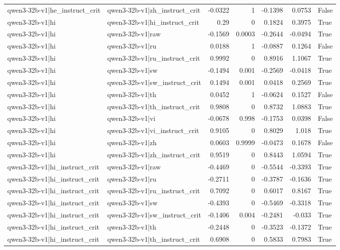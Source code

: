 \begin{table}
\begin{tabular}{l l r r r r l}
qwen3-32b-v1|he_instruct_crit & qwen3-32b-v1|zh_instruct_crit & -0.0322 & 1 & -0.1398 & 0.0753 & False \\
qwen3-32b-v1|hi & qwen3-32b-v1|hi_instruct_crit & 0.29 & 0 & 0.1824 & 0.3975 & True \\
qwen3-32b-v1|hi & qwen3-32b-v1|raw & -0.1569 & 0.0003 & -0.2644 & -0.0494 & True \\
qwen3-32b-v1|hi & qwen3-32b-v1|ru & 0.0188 & 1 & -0.0887 & 0.1264 & False \\
qwen3-32b-v1|hi & qwen3-32b-v1|ru_instruct_crit & 0.9992 & 0 & 0.8916 & 1.1067 & True \\
qwen3-32b-v1|hi & qwen3-32b-v1|sw & -0.1494 & 0.001 & -0.2569 & -0.0418 & True \\
qwen3-32b-v1|hi & qwen3-32b-v1|sw_instruct_crit & 0.1494 & 0.001 & 0.0418 & 0.2569 & True \\
qwen3-32b-v1|hi & qwen3-32b-v1|th & 0.0452 & 1 & -0.0624 & 0.1527 & False \\
qwen3-32b-v1|hi & qwen3-32b-v1|th_instruct_crit & 0.9808 & 0 & 0.8732 & 1.0883 & True \\
qwen3-32b-v1|hi & qwen3-32b-v1|vi & -0.0678 & 0.998 & -0.1753 & 0.0398 & False \\
qwen3-32b-v1|hi & qwen3-32b-v1|vi_instruct_crit & 0.9105 & 0 & 0.8029 & 1.018 & True \\
qwen3-32b-v1|hi & qwen3-32b-v1|zh & 0.0603 & 0.9999 & -0.0473 & 0.1678 & False \\
qwen3-32b-v1|hi & qwen3-32b-v1|zh_instruct_crit & 0.9519 & 0 & 0.8443 & 1.0594 & True \\
qwen3-32b-v1|hi_instruct_crit & qwen3-32b-v1|raw & -0.4469 & 0 & -0.5544 & -0.3393 & True \\
qwen3-32b-v1|hi_instruct_crit & qwen3-32b-v1|ru & -0.2711 & 0 & -0.3787 & -0.1636 & True \\
qwen3-32b-v1|hi_instruct_crit & qwen3-32b-v1|ru_instruct_crit & 0.7092 & 0 & 0.6017 & 0.8167 & True \\
qwen3-32b-v1|hi_instruct_crit & qwen3-32b-v1|sw & -0.4393 & 0 & -0.5469 & -0.3318 & True \\
qwen3-32b-v1|hi_instruct_crit & qwen3-32b-v1|sw_instruct_crit & -0.1406 & 0.004 & -0.2481 & -0.033 & True \\
qwen3-32b-v1|hi_instruct_crit & qwen3-32b-v1|th & -0.2448 & 0 & -0.3523 & -0.1372 & True \\
qwen3-32b-v1|hi_instruct_crit & qwen3-32b-v1|th_instruct_crit & 0.6908 & 0 & 0.5833 & 0.7983 & True \\

\end{tabular}
\end{table}
